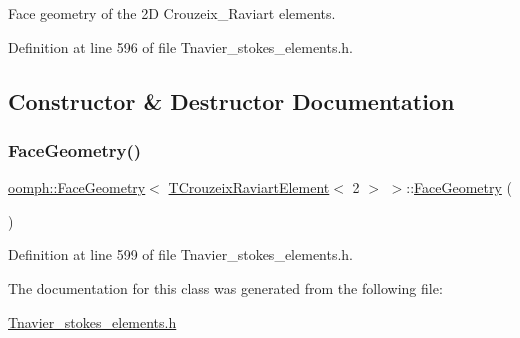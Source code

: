 Face geometry of the 2D Crouzeix\+\_\+\+Raviart elements. 

Definition at line 596 of file Tnavier\+\_\+stokes\+\_\+elements.\+h.



\subsection{Constructor \& Destructor Documentation}
\mbox{\label{classoomph_1_1FaceGeometry_3_01TCrouzeixRaviartElement_3_012_01_4_01_4_a01cfe03fc0e52784e0bbb9106bed79fb}} 
\subsubsection{\texorpdfstring{Face\+Geometry()}{FaceGeometry()}}
{\footnotesize\ttfamily \hyperlink{classoomph_1_1FaceGeometry}{oomph\+::\+Face\+Geometry}$<$ \hyperlink{classoomph_1_1TCrouzeixRaviartElement}{T\+Crouzeix\+Raviart\+Element}$<$ 2 $>$ $>$\+::\hyperlink{classoomph_1_1FaceGeometry}{Face\+Geometry} (\begin{DoxyParamCaption}{ }\end{DoxyParamCaption})\hspace{0.3cm}{\ttfamily [inline]}}



Definition at line 599 of file Tnavier\+\_\+stokes\+\_\+elements.\+h.



The documentation for this class was generated from the following file\+:\begin{DoxyCompactItemize}
\item 
\hyperlink{Tnavier__stokes__elements_8h}{Tnavier\+\_\+stokes\+\_\+elements.\+h}\end{DoxyCompactItemize}
